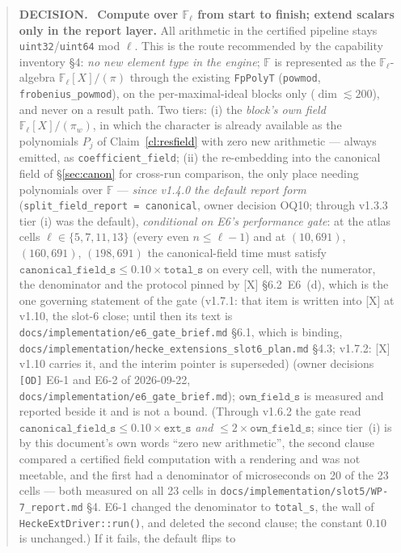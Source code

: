\documentclass[11pt]{article}
\theoremstyle{remark}
\newcommand{\F}{\mathbb{F}}
\newcommand{\Fl}{\F_\ell}
\newenvironment{decisionbox}
  {\par\medskip\noindent\begin{quote}\textbf{DECISION.}\ }
  {\end{quote}\medskip}
\begin{document}
\begin{decisionbox}
\textbf{Compute over $\Fl$ from start to finish; extend scalars only in the report layer.}
All arithmetic in the certified pipeline stays \texttt{uint32}/\texttt{uint64} mod $\ell$.
This is the route recommended by the capability inventory \S4: \emph{no new element type in the
engine}; $\F$ is represented as the $\Fl$-algebra $\Fl[X]/(\pi)$ through the existing
\texttt{FpPolyT} (\texttt{powmod}, \texttt{frobenius\_powmod}), on the per-maximal-ideal blocks only
($\dim\lesssim200$), and never on a result path. Two tiers: (i) the \emph{block's own field}
$\Fl[X]/(\pi_w)$, in which the character is already available as the polynomials $P_j$ of
Claim~\ref{cl:resfield} with zero new arithmetic --- always emitted, as
\texttt{coefficient\_field}; (ii) the re-embedding into the canonical field of \S\ref{sec:canon}
for cross-run comparison, the only place needing polynomials over $\F$ --- \emph{since v1.4.0
the default report form} (\texttt{split\_field\_report = canonical}, owner decision OQ10; through
v1.3.3 tier (i) was the default), \emph{conditional on E6's performance gate}: at the atlas cells
$\ell\in\{5,7,11,13\}$ (every even $n\le\ell-1$) and at $(10,691)$, $(160,691)$, $(198,691)$ the
canonical-field time must satisfy
$\texttt{canonical\_field\_s}\le0.10\times\texttt{total\_s}$ on every cell, with the numerator,
the denominator and the protocol pinned by [X] \S6.2~E6~(d), which is the one governing statement
of the gate (v1.7.1: that item is written into [X] at v1.10, the slot-6 close; until then its text
is \texttt{docs/implementation/e6\_gate\_brief.md} \S6.1, which is binding,
\texttt{docs/implementation/hecke\_extensions\_slot6\_plan.md} \S4.3; v1.7.2: [X] v1.10 carries it,
and the interim pointer is superseded) (owner decisions \texttt{[OD]} E6-1 and E6-2 of 2026-09-22,
\texttt{docs/implementation/e6\_gate\_brief.md}); $\texttt{own\_field\_s}$ is measured and
reported beside it and is not a bound. (Through v1.6.2 the gate read
$\texttt{canonical\_field\_s}\le0.10\times\texttt{ext\_s}$ \emph{and}
$\le2\times\texttt{own\_field\_s}$; since tier~(i) is by this document's own words ``zero new
arithmetic'', the second clause compared a certified field computation with a rendering and was
not meetable, and the first had a denominator of microseconds on 20 of the 23 cells --- both
measured on all 23 cells in \texttt{docs/implementation/slot5/WP-7\_report.md} \S4. E6-1 changed
the denominator to \texttt{total\_s}, the wall of \texttt{HeckeExtDriver::run()}, and deleted the
second clause; the constant $0.10$ is unchanged.) If it fails, the default flips to

\end{decisionbox}
\end{document}
